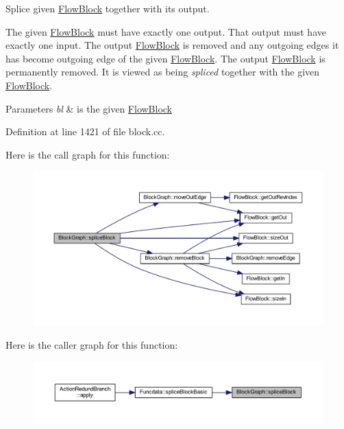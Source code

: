 Splice given \mbox{\hyperlink{class_flow_block}{Flow\+Block}} together with its output. 

The given \mbox{\hyperlink{class_flow_block}{Flow\+Block}} must have exactly one output. That output must have exactly one input. The output \mbox{\hyperlink{class_flow_block}{Flow\+Block}} is removed and any outgoing edges it has become outgoing edge of the given \mbox{\hyperlink{class_flow_block}{Flow\+Block}}. The output \mbox{\hyperlink{class_flow_block}{Flow\+Block}} is permanently removed. It is viewed as being {\itshape spliced} together with the given \mbox{\hyperlink{class_flow_block}{Flow\+Block}}. 
\begin{DoxyParams}{Parameters}
{\em bl} & is the given \mbox{\hyperlink{class_flow_block}{Flow\+Block}} \\
\hline
\end{DoxyParams}


Definition at line 1421 of file block.\+cc.

Here is the call graph for this function\+:
\nopagebreak
\begin{figure}[H]
\begin{center}
\leavevmode
\includegraphics[width=350pt]{class_block_graph_a4f6da43f90aeadf0b19ddbcd95544fd3_cgraph}
\end{center}
\end{figure}
Here is the caller graph for this function\+:
\nopagebreak
\begin{figure}[H]
\begin{center}
\leavevmode
\includegraphics[width=350pt]{class_block_graph_a4f6da43f90aeadf0b19ddbcd95544fd3_icgraph}
\end{center}
\end{figure}
\mbox{\label{class_block_graph_a468717bd5cf1e3bd34e5221a5d425bd9}} 
